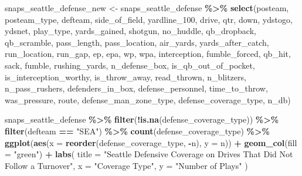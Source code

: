 \documentclass[
]{article}
\newenvironment{Shaded}{\begin{snugshade}}{\end{snugshade}}
\newcommand{\AttributeTok}[1]{\textcolor[rgb]{0.13,0.29,0.53}{#1}}
\newcommand{\FunctionTok}[1]{\textcolor[rgb]{0.13,0.29,0.53}{\textbf{#1}}}
\newcommand{\NormalTok}[1]{#1}
\newcommand{\OtherTok}[1]{\textcolor[rgb]{0.56,0.35,0.01}{#1}}
\newcommand{\SpecialCharTok}[1]{\textcolor[rgb]{0.81,0.36,0.00}{\textbf{#1}}}
\newcommand{\StringTok}[1]{\textcolor[rgb]{0.31,0.60,0.02}{#1}}
\begin{document}
\begin{Shaded}
\begin{Highlighting}[]
\NormalTok{snaps\_seattle\_defense\_new }\OtherTok{\textless{}{-}}\NormalTok{ snaps\_seattle\_defense }\SpecialCharTok{\%\textgreater{}\%} \FunctionTok{select}\NormalTok{(posteam, posteam\_type, defteam, side\_of\_field,}
\NormalTok{                                 yardline\_100, drive, qtr, down, ydstogo, ydsnet,}
\NormalTok{                                 play\_type, yards\_gained, shotgun, no\_huddle, qb\_dropback,}
\NormalTok{                                 qb\_scramble, pass\_length, pass\_location, air\_yards, yards\_after\_catch,}
\NormalTok{                                 run\_location, run\_gap, ep, epa, wp, wpa, interception, fumble\_forced,}
\NormalTok{                                 qb\_hit, sack, fumble, rushing\_yards, n\_defense\_box, is\_qb\_out\_of\_pocket,}
\NormalTok{                                 is\_interception\_worthy, is\_throw\_away, read\_thrown, n\_blitzers, n\_pass\_rushers,}
\NormalTok{                                 defenders\_in\_box, defense\_personnel, time\_to\_throw, was\_pressure, }
\NormalTok{                                 route, defense\_man\_zone\_type, defense\_coverage\_type, n\_db)}
\end{Highlighting}
\end{Shaded}

\begin{Shaded}
\begin{Highlighting}[]
\NormalTok{snaps\_seattle\_defense }\SpecialCharTok{\%\textgreater{}\%} \FunctionTok{filter}\NormalTok{(}\SpecialCharTok{!}\FunctionTok{is.na}\NormalTok{(defense\_coverage\_type)) }\SpecialCharTok{\%\textgreater{}\%}
  \FunctionTok{filter}\NormalTok{(defteam }\SpecialCharTok{==} \StringTok{"SEA"}\NormalTok{) }\SpecialCharTok{\%\textgreater{}\%}
  \FunctionTok{count}\NormalTok{(defense\_coverage\_type) }\SpecialCharTok{\%\textgreater{}\%}
  \FunctionTok{ggplot}\NormalTok{(}\FunctionTok{aes}\NormalTok{(}\AttributeTok{x =} \FunctionTok{reorder}\NormalTok{(defense\_coverage\_type, }\SpecialCharTok{{-}}\NormalTok{n), }\AttributeTok{y =}\NormalTok{ n)) }\SpecialCharTok{+}
  \FunctionTok{geom\_col}\NormalTok{(}\AttributeTok{fill =} \StringTok{"green"}\NormalTok{) }\SpecialCharTok{+}
  \FunctionTok{labs}\NormalTok{(}
    \AttributeTok{title =} \StringTok{"Seattle Defensive Coverage on Drives That Did Not Follow a Turnover"}\NormalTok{,}
    \AttributeTok{x =} \StringTok{"Coverage Type"}\NormalTok{,}
    \AttributeTok{y =} \StringTok{"Number of Plays"}
\NormalTok{  )}
\end{Highlighting}
\end{Shaded}
\end{document}
